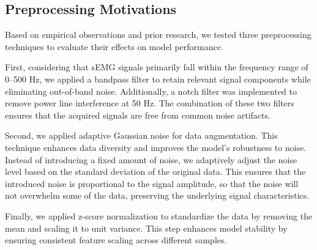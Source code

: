 \subsection{Preprocessing Motivations}

Based on empirical observations and prior research, 
we tested three preprocessing techniques to evaluate their effects on model performance.

First, considering that sEMG signals primarily fall within the frequency range of 0--500 Hz, 
we applied a bandpass filter to retain relevant signal components while eliminating out-of-band noise. 
Additionally, a notch filter was implemented to remove power line interference at 50 Hz. 
The combination of these two filters ensures that the acquired signals are free from common noise artifacts.

Second, we applied adaptive Gaussian noise for data augmentation. 
This technique enhances data diversity and improves the model's robustness to noise. 
Instead of introducing a fixed amount of noise, we adaptively adjust the noise level 
based on the standard deviation of the original data. 
This ensures that the introduced noise is proportional to the signal amplitude, 
so that the noise will not overwhelm some of the data, preserving the underlying signal characteristics.

Finally, we applied z-score normalization to standardize the data by removing the mean and scaling it to unit variance. 
This step enhances model stability by ensuring consistent feature scaling across different samples.


